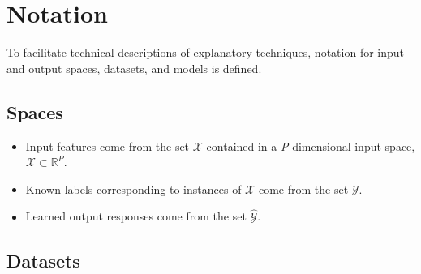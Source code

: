 \documentclass[sigconf, review]{acmart}
\begin{document}
\section{Notation} \label{sec:notation}

To facilitate technical descriptions of explanatory techniques, notation for input and output spaces, datasets, and models is defined.

\subsection{Spaces} 
 
	\begin{itemize}
		\item Input features come from the set $\mathcal{X}$ contained in a \textit{P}-dimensional input space, $\mathcal{X} \subset \mathbb{R}^P$.  
		\item Known labels corresponding to instances of $\mathcal{X}$ come from the set $\mathcal{Y}$.
		\item Learned output responses come from the set $\mathcal{\hat{Y}}$. %
	\end{itemize}	
	
\subsection{Datasets} 
\end{document}
